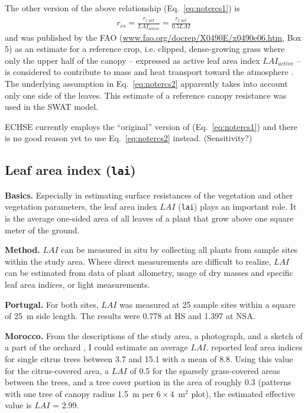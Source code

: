 \documentclass{scrreprt}
\begin{document}
The other version of the above relationship (Eq.~\ref{eq:notercs1}) is
\begin{align} \label{eq:notercs2}
  r_{cs} = \frac{\overline{r_{l,act}}}{LAI_{active}} = \frac{\overline{r_{l,act}}}{0.5 LAI}
\end{align}
%
and was published by the FAO (\url{www.fao.org/docrep/X0490E/x0490e06.htm}, Box 5) as an estimate for a reference crop, i.e. clipped, dense-growing grass where only the upper half of the canopy -- expressed as active leaf area index $LAI_{active}$ -- is considered to contribute to mass and heat transport toward the atmosphere \citep{fao98}.
The underlying assumption in Eq.~\eqref{eq:notercs2} apparently takes into account only one side of the leaves.
This estimate of a reference canopy resistance was used in the SWAT model.

ECHSE currently employs the ``original'' version of \citet{shuttleworth85} (Eq.~\ref{eq:notercs1}) and there is no good reason yet to use Eq.~\eqref{eq:notercs2} instead.
(Sensitivity?)

\subsection{Leaf area index (\texttt{lai})} \label{ssec:parest_veg_lai}

\textbf{Basics.}
Especially in estimating surface resistances of the vegetation and other vegetation parameters, the leaf area index $LAI$ (\verb!lai!) plays an important role.
It is the average one-sided area of all leaves of a plant that grow above one square meter of the ground.

\textbf{Method.}
$LAI$ can be measured in situ by collecting all plants from sample sites within the study area.
Where direct measurements are difficult to realize, $LAI$ can be estimated from data of plant allometry, usage of dry masses and specific leaf area indices, or light measurements.

\textbf{Portugal.}
For both sites, $LAI$ was measured at 25 sample sites within a square of 25~m side length.
The results were 0.778 at HS and 1.397 at NSA.

\textbf{Morocco.}
From the descriptions of the study area, a photograph, and a sketch of a part of the orchard \citep{mroos14}, I could estimate an average $LAI$.
\citet{jahn79} reported leaf area indices for single citrus trees between 3.7 and 15.1 with a mean of 8.8.
Using this value for the citrus-covered area, a $LAI$ of 0.5 for the sparsely grass-covered areas between the trees, and a tree cover portion in the area of roughly 0.3 (patterns with one tree of canopy radius 1.5~m per $6 \times 4$~m$^2$ plot), the estimated effective value is $LAI$ = 2.99.
\end{document}
